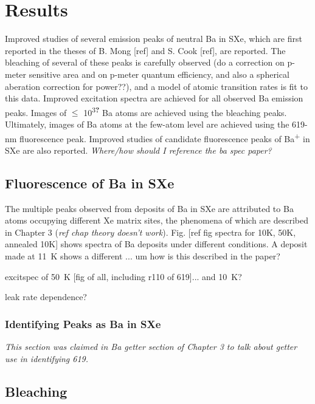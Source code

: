 \chapter{Results}

Improved studies of several emission peaks of neutral Ba in SXe, which are first reported in the theses of B. Mong [ref] and S. Cook [ref], are reported.  The bleaching of several of these peaks is carefully observed ({\color{red}do a correction on p-meter sensitive area and on p-meter quantum efficiency, and also a spherical aberation correction for power??}), and a model of atomic transition rates is fit to this data.  Improved excitation spectra are achieved for all observed Ba emission peaks.  Images of $\leq$ 10\textsuperscript{3\textbf{?}} Ba atoms are achieved using the bleaching peaks.  Ultimately, images of Ba atoms at the few-atom level are achieved using the 619-nm fluorescence peak.  Improved studies of candidate fluorescence peaks of Ba\textsuperscript{+} in SXe are also reported.  {\color{red}\emph{Where/how should I reference the ba spec paper?}}

\section{Fluorescence of Ba in SXe}

The multiple peaks observed from deposits of Ba in SXe are attributed to Ba atoms occupying different Xe matrix sites, the phenomena of which are described in Chapter 3 {\color{red}(\emph{ref chap theory doesn't work})}.  Fig. [ref fig spectra for 10K, 50K, annealed 10K] shows spectra of Ba deposits under different conditions.  A deposit made at 11~K shows a different ... um how is this described in the paper?

excitspec of 50~K [fig of all, including r110 of 619]... and 10~K?

leak rate dependence?

\subsection{Identifying Peaks as Ba in SXe}
\label{subsec:peakIdentify}

\emph{\color{gray}This section was claimed in Ba getter section of Chapter 3 to talk about getter use in identifying 619.}

\section{Bleaching}

